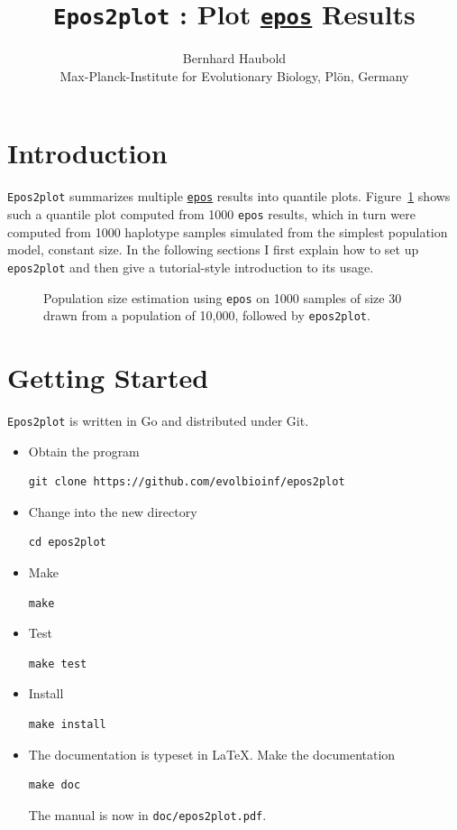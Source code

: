 \documentclass[a4paper]{article}
\newcommand{\ty}{\texttt}
\begin{document}
\title{\ty{Epos2plot} : Plot \href{http://github.com/evolbioinf/epos}{\ty{epos}} Results}
\author{Bernhard Haubold\\\small Max-Planck-Institute for Evolutionary
  Biology, Pl\"on, Germany}
\date{}
\maketitle
\section{Introduction}
\ty{Epos2plot} summarizes multiple
\href{http://github.com/evolbioinf/epos}{\ty{epos}} results into
quantile plots. Figure~\ref{fig:qua} shows such a quantile plot 
computed from 1000 \ty{epos} \citep{lyn19:inf} results, which in turn
were computed from 1000 haplotype samples simulated
from the simplest population model, constant size. In the following
sections I first explain how to set up \ty{epos2plot} and then give a
tutorial-style introduction to its usage.

\begin{figure}
  \begin{center}
    \scalebox{0.6}{}
  \end{center}
  \caption{Population size estimation using \ty{epos} on 1000 samples
    of size 30 drawn from a population of 10,000, followed by
    \ty{epos2plot}.}\label{fig:qua}
\end{figure}

\section{Getting Started}
\ty{Epos2plot} is written in Go and distributed under Git.
\begin{itemize}
\item Obtain the program
\begin{verbatim}
git clone https://github.com/evolbioinf/epos2plot
\end{verbatim}
\item Change into the new directory
\begin{verbatim}
cd epos2plot
\end{verbatim}
\item Make
\begin{verbatim}
make
\end{verbatim}
\item Test
\begin{verbatim}
make test
\end{verbatim}
\item Install
\begin{verbatim}
make install
\end{verbatim}
\item The documentation is typeset in \LaTeX{}. Make the documentation
\begin{verbatim}
make doc
\end{verbatim}
The manual is now in \ty{doc/epos2plot.pdf}.
\end{itemize}
\end{document}
